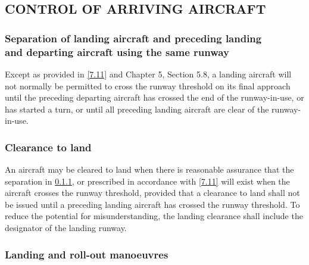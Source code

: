 \subsection[Control of arriving aircraft]{CONTROL OF ARRIVING AIRCRAFT}

\subsubsection[Separation of landing aircraft and preceding landing and departing aircraft using the same runway]{Separation of landing aircraft and preceding landing \\ and departing aircraft using the same runway} \label{7.10.1}

Except as provided in \ref{7.11} and Chapter 5, Section 5.8, a landing aircraft will not normally be permitted to cross the runway threshold on its final approach until the preceding departing aircraft has crossed the end of the runway-in-use, or has started a turn, or until all preceding landing aircraft are clear of the runway-in-use.

\subsubsection{Clearance to land}

An aircraft may be cleared to land when there is reasonable assurance that the separation in \ref{7.10.1}, or prescribed in accordance with \ref{7.11} will exist when the aircraft crosses the runway threshold, provided that a clearance to land shall not be issued until a preceding landing aircraft has crossed the runway threshold. To reduce the potential for misunderstanding, the landing clearance shall include the designator of the landing runway.

\subsubsection{Landing and roll-out manoeuvres}

